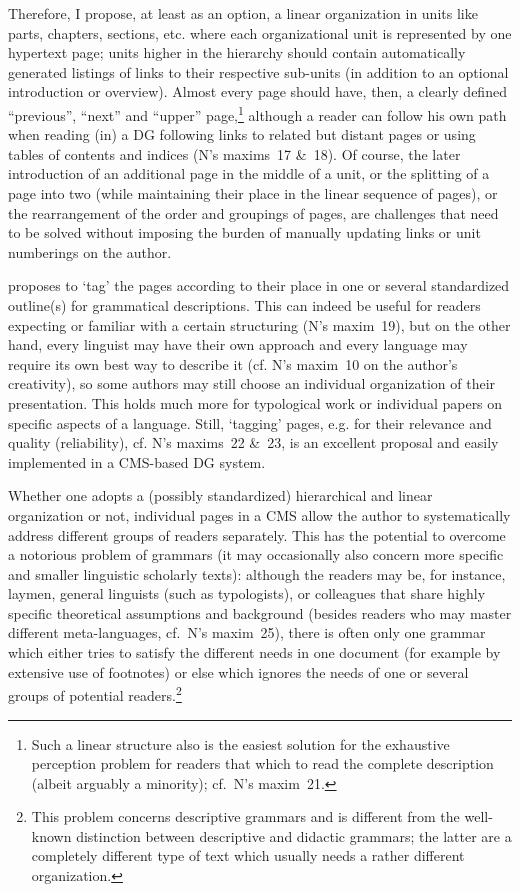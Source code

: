 Therefore, I propose, at least as an option, a linear organization in units like parts, chapters, sections, etc. where each organizational unit is represented by one hypertext page; units higher in the hierarchy should contain automatically generated listings of links to their respective sub-units (in addition to an optional introduction or overview). Almost every page should have, then, a clearly defined ``previous'', ``next'' and ``upper'' page,\footnote{Such 
 a linear structure also is the easiest solution for the exhaustive perception problem for readers that which to read the complete description (albeit arguably a minority); cf.~N's maxim~21.
} 
although a reader can follow his own path when reading (in) a DG following links to related but distant pages or using tables of contents and indices (N's maxims~17 \&~18). Of course, the later introduction of an additional page in the middle of a unit, or the splitting of a page into two (while maintaining their place in the linear sequence of pages), or the rearrangement of the order and groupings of pages, are challenges that need to be solved without imposing the burden of manually updating links or unit numberings on the author.

\citet{Nordhoff2008} proposes to `tag' the pages according to their place in one or several standardized outline(s) for grammatical descriptions. This can indeed be useful for readers expecting or familiar with a certain structuring (N's maxim~19), but on the other hand, every linguist may have their own approach and every language may require its own best way to describe it (cf. N's maxim~10 on the author's creativity), so some authors may still choose an individual organization of their presentation. This holds much more for typological work or individual papers on specific aspects of a language. Still, `tagging' pages, e.g. for their relevance and quality (reliability), cf. N's maxims~22 \&~23, is an excellent proposal and easily implemented in a CMS-based DG system. 

Whether one adopts a (possibly standardized) hierarchical and linear organization or not, individual pages in a CMS allow the author to systematically address different groups of readers separately. This has the potential to overcome a notorious problem of grammars (it may occasionally also concern more specific and smaller linguistic scholarly texts): although the readers may be, for instance, laymen, general linguists (such as typologists), or colleagues that share highly specific theoretical assumptions and background (besides readers who may master different meta-languages, cf.~N's maxim~25), there is often only one grammar which either tries to satisfy the different needs in one document (for example by extensive use of footnotes) or else which ignores the needs of one or several groups of potential readers.\footnote{This 
 problem concerns descriptive grammars and is different from the well-known distinction between descriptive and didactic grammars; the latter are a completely different type of text which usually needs a rather different organization.
}

